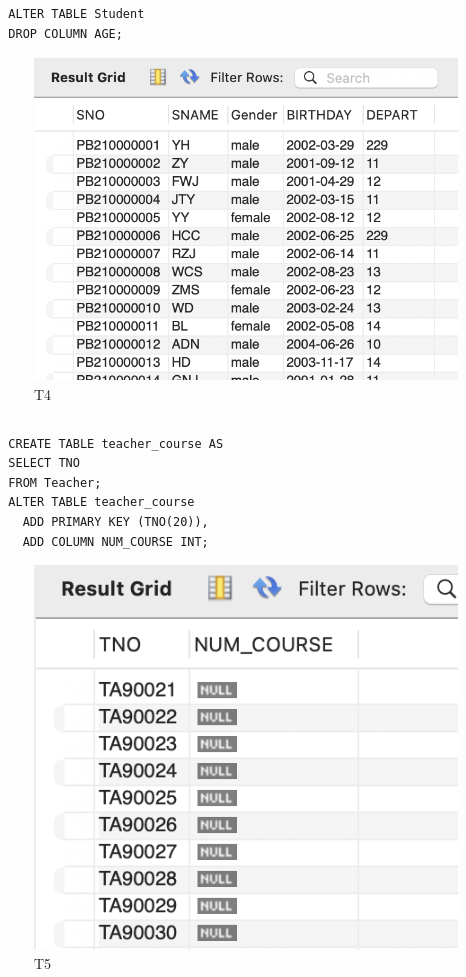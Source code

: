 \documentclass[UTF8]{ctexart}
\begin{document}
\subsection{}
\begin{lstlisting}
  ALTER TABLE Student
  DROP COLUMN AGE;
\end{lstlisting}
\begin{figure}[H]
  \centering
  \includegraphics[scale=0.4]{pics/4.png}
  \caption*{T4}
\end{figure}

\subsection{}
\begin{lstlisting}
  CREATE TABLE teacher_course AS
  SELECT TNO
  FROM Teacher;
  ALTER TABLE teacher_course
    ADD PRIMARY KEY (TNO(20)),
    ADD COLUMN NUM_COURSE INT;
\end{lstlisting}
\begin{figure}[H]
  \centering
  \includegraphics[scale=0.5]{pics/5.png}
  \caption*{T5}
\end{figure}
\end{document}
